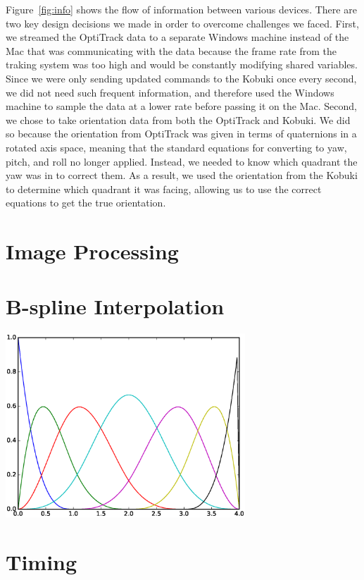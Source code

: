 \documentclass[10pt]{article}
\newenvironment{Figure}
  {\par\medskip\noindent\minipage{\linewidth}}
  {\endminipage\par\medskip}
\begin{document}
\begin{multicols}{2}
  Figure~\ref{fig:info} shows the flow of information between various devices.
  There are two key design decisions we made in order to overcome challenges we
  faced. First, we streamed the OptiTrack data to a separate Windows machine
  instead of the Mac that was communicating with the data because the frame rate
  from the traking system was too high and would be constantly modifying shared
  variables. Since we were only sending updated commands to the Kobuki once
  every second, we did not need such frequent information, and therefore used
  the Windows machine to sample the data at a lower rate before passing it on
  the Mac. Second, we chose to take orientation data from both the OptiTrack and
  Kobuki. We did so because the orientation from OptiTrack was given in terms of
  quaternions in a rotated axis space, meaning that the standard equations for
  converting to yaw, pitch, and roll no longer applied. Instead, we needed to
  know which quadrant the yaw was in to correct them. As a result, we used the
  orientation from the Kobuki to determine which quadrant it was facing,
  allowing us to use the correct equations to get the true orientation.

  \section*{Image Processing}

  \section*{B-spline Interpolation}
  \begin{Figure}
    \includegraphics[width=9cm]{../spline_basis.eps}
     \label{fig:basis}
  \end{Figure}

  \section*{Timing}


\end{multicols}
\end{document}
